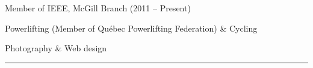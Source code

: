 \documentclass[10pt,letterpaper]{article}
\newenvironment{indentsection}[1]%
{\begin{list}{}%
	{\setlength{\leftmargin}{#1}}%
	\item[]%
}
{\end{list}}
\begin{document}
\begin{indentsection}{\parindent}
\begin{description*}
        \item[]Member of IEEE, McGill Branch (2011 -- Present)
        \item[]Powerlifting (Member of Qu\'{e}bec Powerlifting Federation) \& Cycling
        \item[]Photography \& Web design
\end{description*}
\end{indentsection}

\hrule
\vspace{-0.4em}
\end{document}
